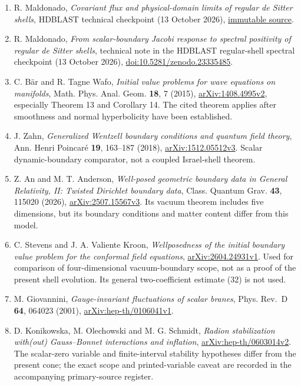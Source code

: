 \documentclass[
  10pt,
]{article}
\providecommand{\tightlist}{%
  \setlength{\itemsep}{0pt}\setlength{\parskip}{0pt}}
\begin{document}
\begin{enumerate}
\def\labelenumi{\arabic{enumi}.}
\tightlist
\item
  R. Maldonado, \emph{Covariant flux and physical-domain limits of
  regular de Sitter shells}, HDBLAST technical checkpoint (13 October
  2026),
  \href{https://github.com/maldonado-research/HDblast/tree/a3757e563dbfd5c9a3fded4d50674bacaf6cafb5/research/HDBLAST_CONE_PHASE_SPACE_20261013}{immutable
  source}.
\item
  R. Maldonado, \emph{From scalar-boundary Jacobi response to spectral
  positivity of regular de Sitter shells}, technical note in the HDBLAST
  regular-shell spectral checkpoint (13 October 2026),
  \href{https://doi.org/10.5281/zenodo.23335485}{doi:10.5281/zenodo.23335485}.
\item
  C. Bär and R. Tagne Wafo, \emph{Initial value problems for wave
  equations on manifolds}, Math. Phys. Anal. Geom. \textbf{18}, 7
  (2015), \href{https://arxiv.org/abs/1408.4995v2}{arXiv:1408.4995v2},
  especially Theorem 13 and Corollary 14. The cited theorem applies
  after smoothness and normal hyperbolicity have been established.
\item
  J. Zahn, \emph{Generalized Wentzell boundary conditions and quantum
  field theory}, Ann. Henri Poincaré \textbf{19}, 163--187 (2018),
  \href{https://arxiv.org/abs/1512.05512v3}{arXiv:1512.05512v3}. Scalar
  dynamic-boundary comparator, not a coupled Israel-shell theorem.
\item
  Z. An and M. T. Anderson, \emph{Well-posed geometric boundary data in
  General Relativity, II: Twisted Dirichlet boundary data}, Class.
  Quantum Grav. \textbf{43}, 115020 (2026),
  \href{https://arxiv.org/abs/2507.15567v3}{arXiv:2507.15567v3}. Its
  vacuum theorem includes five dimensions, but its boundary conditions
  and matter content differ from this model.
\item
  C. Stevens and J. A. Valiente Kroon, \emph{Wellposedness of the
  initial boundary value problem for the conformal field equations},
  \href{https://arxiv.org/abs/2604.24931v1}{arXiv:2604.24931v1}. Used
  for comparison of four-dimensional vacuum-boundary scope, not as a
  proof of the present shell evolution. Its general two-coefficient
  estimate (32) is not used.
\item
  M. Giovannini, \emph{Gauge-invariant fluctuations of scalar branes},
  Phys. Rev.~D \textbf{64}, 064023 (2001),
  \href{https://arxiv.org/abs/hep-th/0106041v1}{arXiv:hep-th/0106041v1}.
\item
  D. Konikowska, M. Olechowski and M. G. Schmidt, \emph{Radion
  stabilization with(out) Gauss--Bonnet interactions and inflation},
  \href{https://arxiv.org/abs/hep-th/0603014v2}{arXiv:hep-th/0603014v2}.
  The scalar-zero variable and finite-interval stability hypotheses
  differ from the present cone; the exact scope and printed-variable
  caveat are recorded in the accompanying primary-source register.
\end{enumerate}
\end{document}
